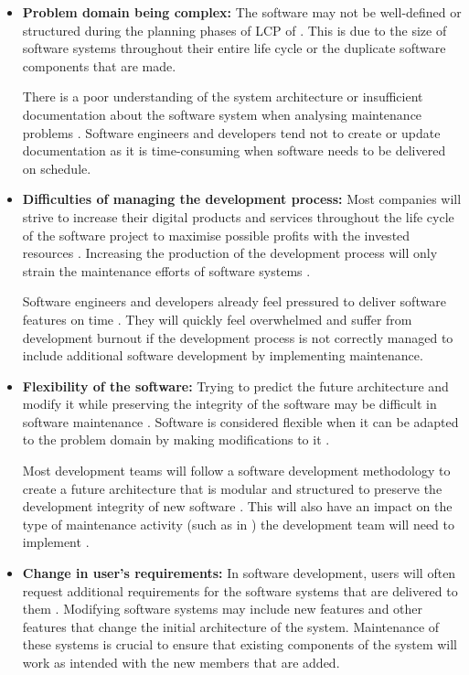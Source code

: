 \begin{itemize}
	\item \textbf{Problem domain being complex:} The software may not be well-defined or structured during the planning phases of LCP of . This is due to the size of software systems throughout their entire life cycle or the duplicate software components that are made.\par There is a poor understanding of the system architecture or insufficient documentation about the software system when analysing maintenance problems \cite{Galster2019}. Software engineers and developers tend not to create or update documentation as it is time-consuming when software needs to be delivered on schedule.
	\item \textbf{Difficulties of managing the development process:} Most companies will strive to increase their digital products and services throughout the life cycle of the software project to maximise possible profits with the invested resources \cite{Niu2018}. Increasing the production of the development process will only strain the maintenance efforts of software systems \cite{Sneed2004}.\par Software engineers and developers already feel pressured to deliver software features on time \cite{Galster2019, Lenarduzzi2017}. They will quickly feel overwhelmed and suffer from development burnout if the development process is not correctly managed to include additional software development by implementing maintenance.
	\item \textbf{Flexibility of the software:} Trying to predict the future architecture and modify it while preserving the integrity of the software may be difficult in software maintenance \cite{Garlan1999}. Software is considered flexible when it can be adapted to the problem domain by making modifications to it \cite{Ogheneovo2014}.\par Most development teams will follow a software development methodology to create a future architecture that is modular and structured to preserve the development integrity of new software \cite{Vijayasarathy2016}. This will also have an impact on the type of maintenance activity (such as in ) the development team will need to implement \cite{Thamburaj2017, Snipes2018}.
	\item \textbf{Change in user's requirements:} In software development, users will often request additional requirements for the software systems that are delivered to them \cite{Ogheneovo2014}. Modifying software systems may include new features and other features that change the initial architecture of the system. Maintenance of these systems is crucial to ensure that existing components of the system will work as intended with the new members that are added.

\end{itemize}

